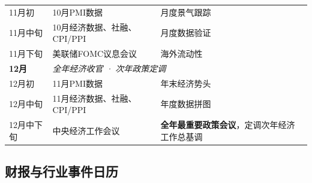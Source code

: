 \begin{exhibitbox}[表9-31：2026年下半年宏观政策与经济数据日历]
\begin{tabularx}{\textwidth}{l X l}
\rowcolor{riskred!5}
11月初 & 10月PMI数据 & 月度景气跟踪 \\
\rowcolor{riskred!5}
11月中旬 & 10月经济数据、社融、CPI/PPI & 月度数据验证 \\
\rowcolor{riskred!5}
11月下旬 & 美联储FOMC议息会议 & 海外流动性 \\
\midrule
\rowcolor{nvgreen!5}
\textbf{12月} & \multicolumn{2}{l}{\textit{全年经济收官 · 次年政策定调}} \\
\rowcolor{nvgreen!5}
12月初 & 11月PMI数据 & 年末经济势头 \\
\rowcolor{nvgreen!5}
12月中旬 & 11月经济数据、社融、CPI/PPI & 年度数据拼图 \\
\rowcolor{nvgreen!5}
12月中下旬 & 中央经济工作会议 & \textbf{全年最重要政策会议}，定调次年经济工作总基调 \\
\bottomrule
\end{tabularx}
\end{exhibitbox}

\subsection{财报与行业事件日历}


